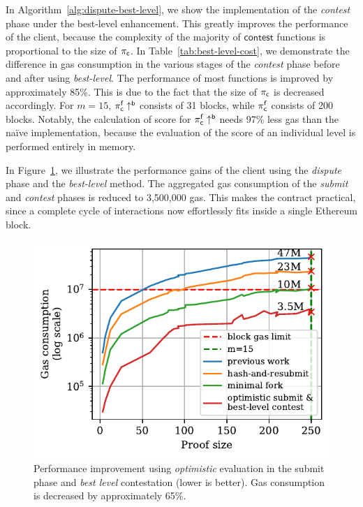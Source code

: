 In Algorithm~\ref{alg:dispute-best-level}, we show the implementation of the
\emph{contest} phase under the best-level enhancement. This greatly improves the performance of the client,
because the complexity of the majority of $\textsf{contest}$ functions is
proportional to the size of $\mathsf{\pi_{c}}$. In Table~\ref{tab:best-level-cost}, we
demonstrate the difference in gas consumption in the various stages of the \emph{contest} phase before and after
using \emph{best-level}. The performance of most functions is improved by
approximately 85\%. This is due to the fact that the size of $\mathsf{\pi_{c}}$ is
decreased accordingly. For $m=15$, $\mathsf{\pi_{c}^f\uparrow^{b}}$ consists of 31 blocks, while
$\mathsf{\pi_{c}^{f}}$ consists of 200 blocks.  Notably, the calculation of score for $\mathsf{\pi_{c}^f\uparrow^{b}}$
needs 97\% less gas than the na\"ive implementation, because the evaluation of the score of an individual level
is performed entirely in memory.



In Figure~\ref{fig:dispute-best-level}, we illustrate the performance gains of
the client using the \emph{dispute} phase and the \emph{best-level} method. The
aggregated gas consumption of the \emph{submit} and \emph{contest} phases is
reduced to {3{,}500{,}000} gas. This makes the contract practical,
since a complete cycle of interactions now effortlessly fits inside a
single Ethereum block.



\begin{figure}[!h]
\vspace*{-3mm}
    \begin{center}
        \includegraphics[width=0.9\columnwidth]{figures/dispute-best-level.pdf}
    \end{center}
\vspace*{-5mm}
    \caption{Performance improvement using \emph{optimistic} evaluation in the submit phase
        and \emph{best level} contestation (lower is better). Gas
        consumption is decreased by approximately 65\%.}
    \label{fig:dispute-best-level}
\vspace*{-5mm}
\end{figure}
